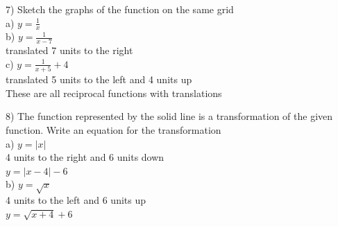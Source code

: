 \documentclass[10pt]{article}
\begin{document}
7) Sketch the graphs of the function on the same grid \\
\hspace*{1em} a) \(y = \frac{1}{x}\) \\
\hspace*{1em} b) \(y = \frac{1}{x-7}\) \\
\hspace*{2em} translated 7 units to the right \\
\hspace*{1em} c) \(y = \frac{1}{x+5} + 4\) \\
\hspace*{2em} translated 5 units to the left and 4 units up \\
\hspace*{1em} These are all reciprocal functions with translations




8) The function represented by the solid line is a transformation of the given function. Write an equation for the transformation \\
a) \(y = \left|x\right|\) \\
\hspace*{1em} 4 units to the right and 6 units down \\
\hspace*{1em} \(y = \left|x-4\right| - 6\) \\
b) \(y = \sqrt{x}\) \\
\hspace*{1em} 4 units to the left and 6 units up \\
\hspace*{1em} \(y = \sqrt{x+4} + 6\)
\end{document}

